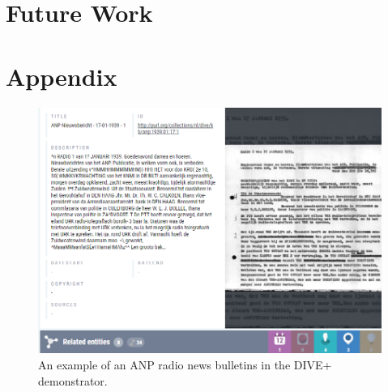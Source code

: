 \documentclass[a4paper, 10pt, conference]{ieeeconf}      %
\begin{document}

\section{Future Work}


%
 

\onecolumn
\section{Appendix}
\appendix
\begin{figure}[H]
  \centering
  \includegraphics[width= \textwidth]{bulletin2}
  \caption{An example of an ANP radio news bulletins in the DIVE+ demonstrator. }
  \label{bulletin}
\end{figure}
\end{document}
